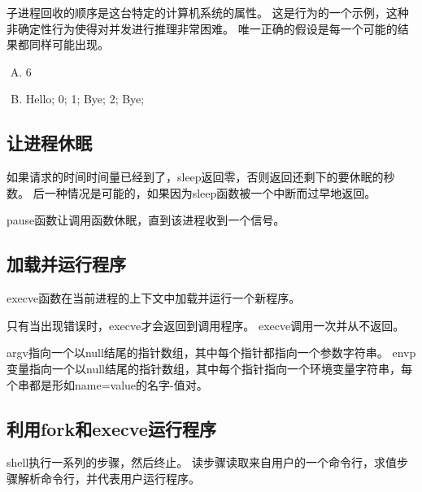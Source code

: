 {{{            子进程回收的顺序是这台特定的计算机系统的属性。
            这是行为的一个示例，这种非确定性行为使得对并发进行推理非常困难。
            唯一正确的假设是每一个可能的结果都同样可能出现。

            \begin{practicec}
                \begin{enumerate}[A.]
                    \item 6
                    \item
                    {
                        Hello;
                        0;
                        1;
                        Bye;
                        2;
                        Bye;
                    }
                \end{enumerate}
            \end{practicec}
        }
    }

    \subsection{让进程休眠}
    {
        如果请求的时间时间量已经到了，sleep返回零，否则返回还剩下的要休眠的秒数。
        后一种情况是可能的，如果因为sleep函数被一个中断而过早地返回。

        pause函数让调用函数休眠，直到该进程收到一个信号。

        \begin{practicec}

        \end{practicec}
    }

    \subsection{加载并运行程序}
    {
        execve函数在当前进程的上下文中加载并运行一个新程序。

        只有当出现错误时，execve才会返回到调用程序。
        execve调用一次并从不返回。

        argv指向一个以null结尾的指针数组，其中每个指针都指向一个参数字符串。
        envp变量指向一个以null结尾的指针数组，其中每个指针指向一个环境变量字符串，每个串都是形如name=value的名字-值对。

        \begin{practicec}

        \end{practicec}
    }

    \subsection{利用fork和execve运行程序}
    {
        shell执行一系列的步骤，然后终止。
        读步骤读取来自用户的一个命令行，求值步骤解析命令行，并代表用户运行程序。

}}
